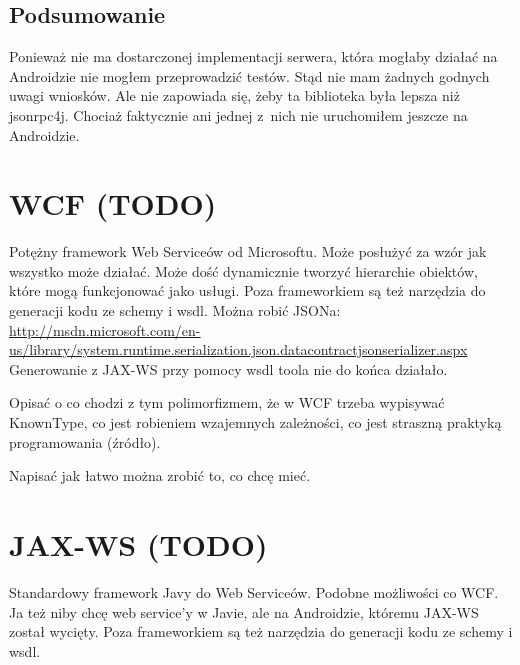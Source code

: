 \subsection{Podsumowanie}
Ponieważ nie ma dostarczonej implementacji serwera, która mogłaby działać na Androidzie nie mogłem przeprowadzić testów.
Stąd nie mam żadnych godnych uwagi wniosków.
Ale nie zapowiada się, żeby ta biblioteka była lepsza niż jsonrpc4j. Chociaż faktycznie ani jednej z~nich nie uruchomiłem jeszcze na Androidzie.




\section{WCF (TODO)}
Potężny framework Web Serviceów od Microsoftu. Może posłużyć za wzór jak wszystko może działać. Może dość dynamicznie tworzyć hierarchie obiektów, które mogą funkcjonować jako usługi.
Poza frameworkiem są też narzędzia do generacji kodu ze schemy i wsdl.
Można robić JSONa: \url{http://msdn.microsoft.com/en-us/library/system.runtime.serialization.json.datacontractjsonserializer.aspx}\\

Generowanie z JAX-WS przy pomocy wsdl toola nie do końca działało.

Opisać o co chodzi z tym polimorfizmem, że w WCF trzeba wypisywać KnownType, co jest robieniem wzajemnych zależności, co jest straszną praktyką programowania (źródło).

Napisać jak łatwo można zrobić to, co chcę mieć.




\section{JAX-WS (TODO)}
Standardowy framework Javy do Web Serviceów. Podobne możliwości co WCF\@. Ja też niby chcę web service'y w Javie, ale na Androidzie, któremu JAX-WS został wycięty.
Poza frameworkiem są też narzędzia do generacji kodu ze schemy i wsdl.

